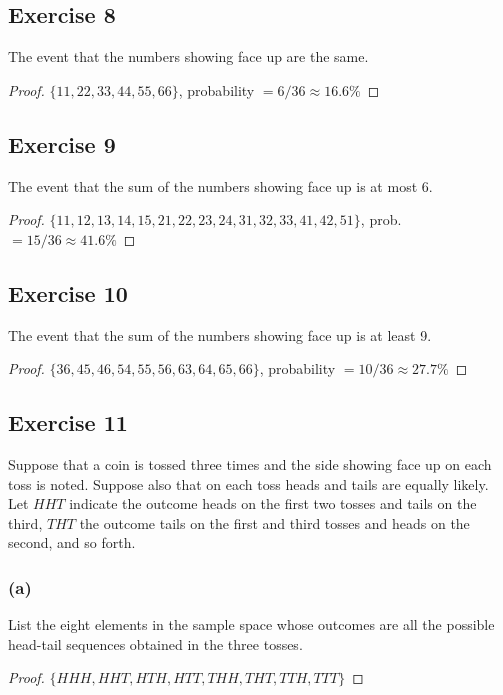 \documentclass[14pt]{extarticle}
\begin{document}
\subsection{Exercise 8}
The event that the numbers showing face up are the same.

\begin{proof}
\(\{11, 22, 33, 44, 55, 66\}\), probability \(= 6/36 \approx 16.6\%\)
\end{proof}

\subsection{Exercise 9}
The event that the sum of the numbers showing face up is at most 6.

\begin{proof}
\(\{11, 12, 13, 14, 15, 21, 22, 23, 24, 31, 32, 33, 41, 42, 51\}\), prob. \(= 15/36 \approx 41.6\%\)
\end{proof}

\subsection{Exercise 10}
The event that the sum of the numbers showing face up is at least 9.

\begin{proof}
\(\{36, 45, 46, 54, 55, 56, 63, 64, 65, 66\}\), probability \(= 10/36 \approx 27.7\%\)
\end{proof}

\subsection{Exercise 11}
Suppose that a coin is tossed three times and the side showing face up on each toss is noted. Suppose also that on 
each toss heads and tails are equally likely. Let \(HHT\) indicate the outcome heads on the first two tosses and 
tails on the third, \(THT\) the outcome tails on the first and third tosses and heads on the second, and so forth.

\subsubsection{(a)}
List the eight elements in the sample space whose outcomes are all the possible head-tail sequences obtained in the 
three tosses.

\begin{proof}
\(\{HHH, HHT, HTH, HTT, THH, THT, TTH, TTT\}\)
\end{proof}
\end{document}
